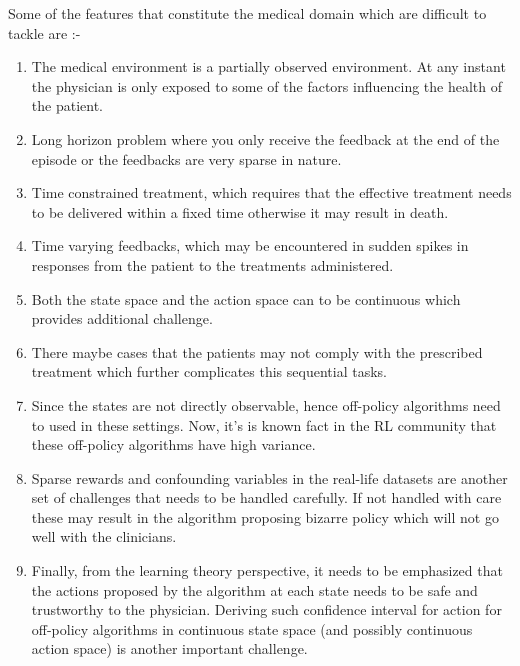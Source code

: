 Some of the features that constitute the medical domain which are difficult to tackle are :-

\begin{enumerate}
\item The medical environment is a partially observed environment. At any instant the physician is only exposed to some of the factors influencing the health of the patient.
\item Long horizon problem where you only receive the feedback at the end of the episode or the feedbacks are very sparse in nature.
\item Time constrained treatment, which requires that the effective treatment needs to be delivered within a fixed time otherwise it may result in death.
\item Time varying feedbacks, which may be encountered in sudden spikes in responses from the patient to the treatments administered.
\item Both the state space and the action space can to be continuous which provides additional challenge.
\item There maybe cases that the patients may not comply with the prescribed treatment which further complicates this sequential tasks.
\item Since the states are not directly observable, hence off-policy algorithms need to used in these settings. Now, it's is known fact in the RL community that these off-policy algorithms have high variance.
\item Sparse rewards and confounding variables in the real-life datasets are another set of challenges that needs to be handled carefully. If not handled with care these may result in the algorithm proposing bizarre policy which will not go well with the clinicians.
\item Finally, from the learning theory perspective, it needs to be emphasized that the actions proposed by the algorithm at each state needs to be safe and trustworthy to the physician. Deriving such confidence interval for action for off-policy algorithms in continuous state space (and possibly continuous action space) is another important challenge.
\end{enumerate}